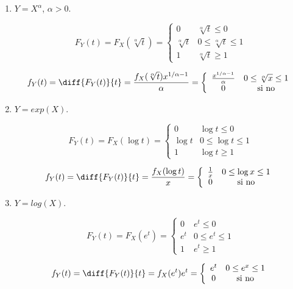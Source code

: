 \documentclass[letterpaper]{article}
\theoremstyle{definition}
\theoremstyle{lemathm}
\theoremstyle{lemademthm}
\begin{document}
\begin{enumerate}
		\begin{enumerate}
			\item $Y = X^\alpha$, $\alpha > 0$.
			
			\[F_Y(t) = F_X(\sqrt[\alpha]{t}) = \left\{\begin{array}{cc}
			
				0 & \sqrt[\alpha]{t} \leq 0\\
				\sqrt[\alpha]{t} & 0 \leq \sqrt[\alpha]{t} \leq 1\\
				1 & \sqrt[\alpha]{t} \geq 1 
			
			\end{array}\right.\]

			\[f_Y(t) = \diff{F_Y(t)}{t} = \frac{f_X(\sqrt[\alpha]{t}) x^{1/\alpha - 1}}{\alpha} = \left\{\begin{array}{cc}
				\frac{x^{1/\alpha - 1}}{\alpha} & 0 \leq \sqrt[\alpha]{x} \leq 1\\
				0 & \text{si no}
			\end{array}\right.\]

			\item $Y = exp(X)$.
			
			\[F_Y(t) = F_X(\log{t}) = \left\{\begin{array}{cc}
			
				0 & \log{t} \leq 0\\
				\log{t} & 0 \leq \log{t} \leq 1\\
				1 & \log{t} \geq 1 
			
			\end{array}\right.\]

			\[f_Y(t) = \diff{F_Y(t)}{t} = \frac{f_X(\log{t})}{x} = \left\{\begin{array}{cc}
				\frac{1}{x} & 0 \leq \log{x} \leq 1\\
				0 & \text{si no}
			\end{array}\right.\]

			\item $Y = log(X)$.
			
			\[F_Y(t) = F_X(e^{t}) = \left\{\begin{array}{cc}
			
				0 & e^{t} \leq 0\\
				e^{t} & 0 \leq e^{t} \leq 1\\
				1 & e^{t} \geq 1 
			
			\end{array}\right.\]

			\[f_Y(t) = \diff{F_Y(t)}{t} = f_X(e^t)e^t = \left\{\begin{array}{cc}
				e^t & 0 \leq e^{x} \leq 1\\
				0 & \text{si no}
			\end{array}\right.\]


\end{enumerate}
\end{enumerate}
\end{document}
